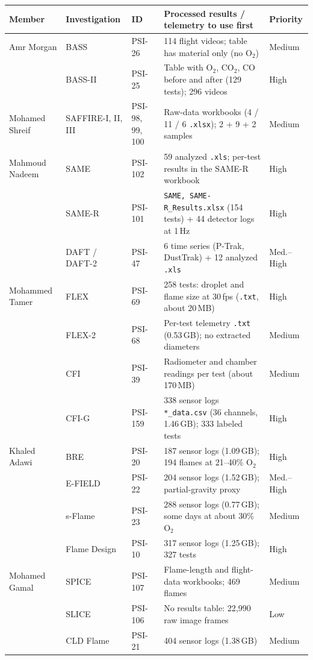\documentclass[10pt,a4paper]{article}
\newcommand{\file}[1]{\nolinkurl{#1}}
\begin{document}
\begin{longtable}{@{}p{2.3cm}p{2.6cm}p{1.6cm}p{6.1cm}p{1.6cm}@{}}
\toprule
\textbf{Member} & \textbf{Investigation} & \textbf{ID} & \textbf{Processed results / telemetry to use first} & \textbf{Priority}\\
\midrule
\endhead
Amr Morgan & BASS & PSI-26 & 114 flight videos; table has material only (no O$_2$) & Medium\\
 & BASS-II & PSI-25 & Table with O$_2$, CO$_2$, CO before and after (129 tests); 296 videos & High\\
Mohamed Shreif & SAFFIRE-I, II, III & PSI-98, 99, 100 & Raw-data workbooks (4 / 11 / 6 \file{.xlsx}); 2 + 9 + 2 samples & Medium\\
Mahmoud Nadeem & SAME & PSI-102 & 59 analyzed \file{.xls}; per-test results in the SAME-R workbook & High\\
 & SAME-R & PSI-101 & \file{SAME, SAME-R_Results.xlsx} (154 tests) + 44 detector logs at 1\,Hz & High\\
 & DAFT / DAFT-2 & PSI-47 & 6 time series (P-Trak, DustTrak) + 12 analyzed \file{.xls} & Med.--High\\
Mohammed Tamer & FLEX & PSI-69 & 258 tests: droplet and flame size at 30\,fps (\file{.txt}, about 20\,MB) & High\\
 & FLEX-2 & PSI-68 & Per-test telemetry \file{.txt} (0.53\,GB); no extracted diameters & Medium\\
 & CFI & PSI-39 & Radiometer and chamber readings per test (about 170\,MB) & Medium\\
 & CFI-G & PSI-159 & 338 sensor logs \file{*_data.csv} (36 channels, 1.46\,GB); 333 labeled tests & High\\
Khaled Adawi & BRE & PSI-20 & 187 sensor logs (1.09\,GB); 194 flames at 21--40\% O$_2$ & High\\
 & E-FIELD & PSI-22 & 204 sensor logs (1.52\,GB); partial-gravity proxy & Med.--High\\
 & s-Flame & PSI-23 & 288 sensor logs (0.77\,GB); some days at about 30\% O$_2$ & Medium\\
 & Flame Design & PSI-10 & 317 sensor logs (1.25\,GB); 327 tests & High\\
Mohamed Gamal & SPICE & PSI-107 & Flame-length and flight-data workbooks; 469 flames & Medium\\
 & SLICE & PSI-106 & No results table: 22,990 raw image frames & Low\\
 & CLD Flame & PSI-21 & 404 sensor logs (1.38\,GB) & Medium\\
\bottomrule
\end{longtable}
\end{document}
